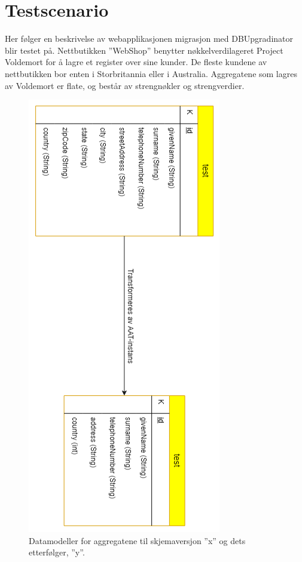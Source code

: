 \section{Testscenario} \label{k51}

Her følger en beskrivelse av webapplikasjonen migrasjon med DBUpgradinator blir testet på. Nettbutikken ''WebShop'' benytter nøkkelverdi\-lageret Project Voldemort for å lagre et register over sine kunder. De fleste kundene av nettbutikken bor enten i Storbritannia eller i Australia. Aggregatene som lagres av Voldemort er flate, og består av strengnøkler og strengverdier.

\begin{figure}[hbtp]
    \centering
    \includegraphics[scale=0.9]{fig/WSS-AggregatModell.png}
    \caption{Datamodeller for aggregatene til skjemaversjon ''x'' og dets etterfølger, ''y''.}
    \label{fig11}
\end{figure}

